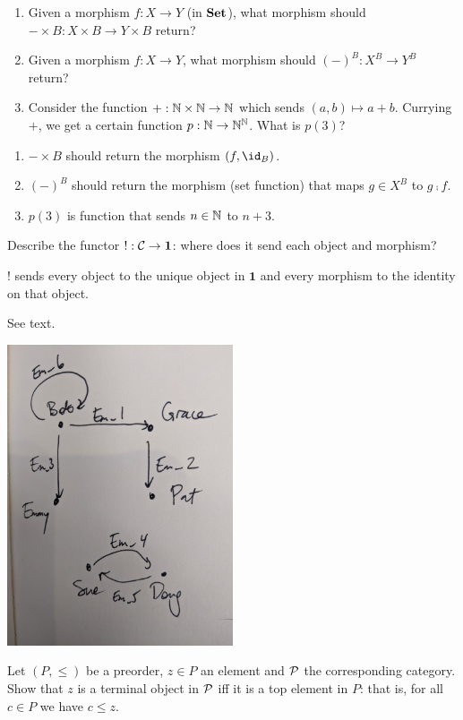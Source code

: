 \begin{enumerate}
	\item Given a morphism $f:X\to Y$ (in $\textbf{Set}$), what morphism should $-\times B:X\times B\to Y\times B$ return?
	\item Given a morphism $f:X\to Y$, what morphism should $(-)^B:X^B\to Y^B$ return?
	\item Consider the function $+:\mathbb{N}\times\mathbb{N}\to\mathbb{N}$ which sends $(a,b)\mapsto a+b$.  Currying $+$, we get a certain function $p:\mathbb{N}\to\mathbb{N}^{\mathbb{N}}$.  What is $p(3)$?
\end{enumerate}

\solution
\begin{enumerate}
	\item $-\times B$ should return the morphism $(f,\id_B)$.
	\item $(-)^B$ should return the morphism (set function) that maps $g\in X^B$ to $g\fcmp f$.
	\item $p(3)$ is function that sends $n\in\mathbb{N}$ to $n+3$.
\end{enumerate}

Describe the functor $!:\mathcal{C}\to\textbf{1}$: where does it send each object and morphism?

\solution
$!$ sends every object to the unique object in $\textbf{1}$ and every morphism to the identity on that object.

See text.

\solution
\includegraphics[width=0.5\textwidth]{images/3-78.jpg}

Let $(P,\leq)$ be a preorder, $z\in P$ an element and $\mathcal{P}$ the corresponding category.  Show that $z$ is a terminal object in $\mathcal{P}$ iff it is a top element in $P$: that is, for all $c\in P$ we have $c\leq z$.

